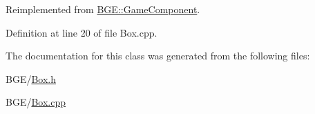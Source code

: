 Reimplemented from \hyperlink{class_b_g_e_1_1_game_component_ac8e444827ee0be9ad654cdff4d15f071}{B\-G\-E\-::\-Game\-Component}.



Definition at line 20 of file Box.\-cpp.



The documentation for this class was generated from the following files\-:\begin{DoxyCompactItemize}
\item 
B\-G\-E/\hyperlink{_box_8h}{Box.\-h}\item 
B\-G\-E/\hyperlink{_box_8cpp}{Box.\-cpp}\end{DoxyCompactItemize}
